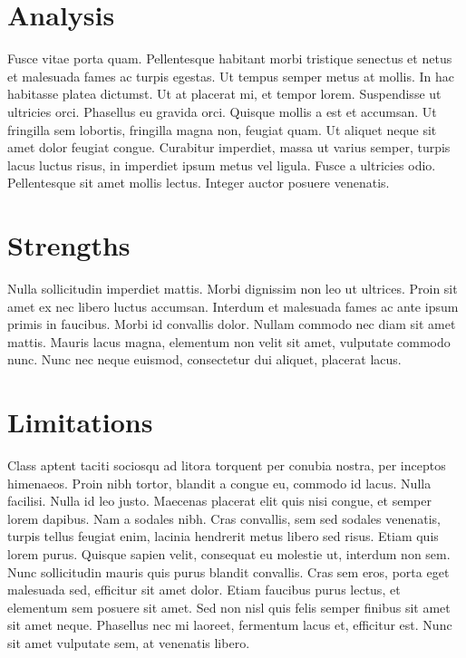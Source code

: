 \section{Analysis}
Fusce vitae porta quam. Pellentesque habitant morbi tristique senectus et netus et malesuada fames ac turpis egestas. Ut tempus semper metus at mollis. In hac habitasse platea dictumst. Ut at placerat mi, et tempor lorem. Suspendisse ut ultricies orci. Phasellus eu gravida orci. Quisque mollis a est et accumsan. Ut fringilla sem lobortis, fringilla magna non, feugiat quam. Ut aliquet neque sit amet dolor feugiat congue. Curabitur imperdiet, massa ut varius semper, turpis lacus luctus risus, in imperdiet ipsum metus vel ligula. Fusce a ultricies odio. Pellentesque sit amet mollis lectus. Integer auctor posuere venenatis.

\section{Strengths}
Nulla sollicitudin imperdiet mattis. Morbi dignissim non leo ut ultrices. Proin sit amet ex nec libero luctus accumsan. Interdum et malesuada fames ac ante ipsum primis in faucibus. Morbi id convallis dolor. Nullam commodo nec diam sit amet mattis. Mauris lacus magna, elementum non velit sit amet, vulputate commodo nunc. Nunc nec neque euismod, consectetur dui aliquet, placerat lacus.

\section{Limitations}
Class aptent taciti sociosqu ad litora torquent per conubia nostra, per inceptos himenaeos. Proin nibh tortor, blandit a congue eu, commodo id lacus. Nulla facilisi. Nulla id leo justo. Maecenas placerat elit quis nisi congue, et semper lorem dapibus. Nam a sodales nibh. Cras convallis, sem sed sodales venenatis, turpis tellus feugiat enim, lacinia hendrerit metus libero sed risus. Etiam quis lorem purus. Quisque sapien velit, consequat eu molestie ut, interdum non sem. Nunc sollicitudin mauris quis purus blandit convallis. Cras sem eros, porta eget malesuada sed, efficitur sit amet dolor. Etiam faucibus purus lectus, et elementum sem posuere sit amet. Sed non nisl quis felis semper finibus sit amet sit amet neque. Phasellus nec mi laoreet, fermentum lacus et, efficitur est. Nunc sit amet vulputate sem, at venenatis libero.


